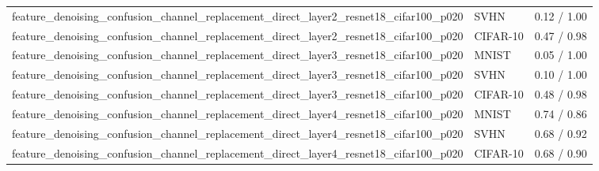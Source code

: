 \begin{tabular}{lll}
feature\_denoising\_confusion\_channel\_replacement\_direct\_layer2\_resnet18\_cifar100\_p020 & SVHN & 0.12 / 1.00 \\
feature\_denoising\_confusion\_channel\_replacement\_direct\_layer2\_resnet18\_cifar100\_p020 & CIFAR-10 & 0.47 / 0.98 \\
feature\_denoising\_confusion\_channel\_replacement\_direct\_layer3\_resnet18\_cifar100\_p020 & MNIST & 0.05 / 1.00 \\
feature\_denoising\_confusion\_channel\_replacement\_direct\_layer3\_resnet18\_cifar100\_p020 & SVHN & 0.10 / 1.00 \\
feature\_denoising\_confusion\_channel\_replacement\_direct\_layer3\_resnet18\_cifar100\_p020 & CIFAR-10 & 0.48 / 0.98 \\
feature\_denoising\_confusion\_channel\_replacement\_direct\_layer4\_resnet18\_cifar100\_p020 & MNIST & 0.74 / 0.86 \\
feature\_denoising\_confusion\_channel\_replacement\_direct\_layer4\_resnet18\_cifar100\_p020 & SVHN & 0.68 / 0.92 \\
feature\_denoising\_confusion\_channel\_replacement\_direct\_layer4\_resnet18\_cifar100\_p020 & CIFAR-10 & 0.68 / 0.90 \\
\bottomrule
\end{tabular}
